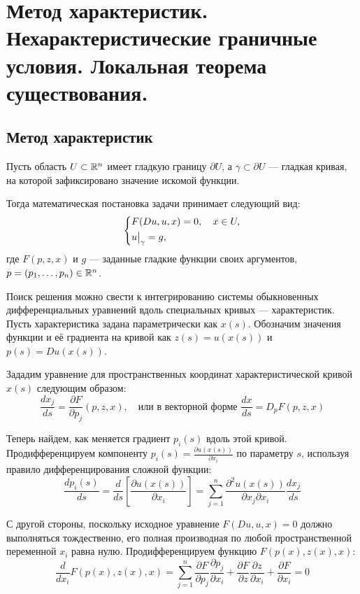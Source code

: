 \section{Метод характеристик. Нехарактеристические граничные условия. Локальная теорема существования.}
\subsection{Метод характеристик}
Пусть область $U \subset \mathbb{R}^n$ имеет гладкую границу $\partial U$, 
а $\gamma \subset \partial U$ — гладкая кривая, на которой зафиксировано 
значение искомой функции. 

Тогда математическая постановка задачи принимает следующий вид:
\begin{equation} \label{eq::1}
\left\{\begin{aligned}
    &F(Du, u, x) = 0, \quad x \in U, \\
    &u\big|_{\gamma} = g,
\end{aligned}\right.
\end{equation}
где $F(p, z, x)$ и $g$ — заданные гладкие функции своих аргументов, 
$p = (p_1, \dots, p_n) \in \mathbb{R}^n$.

Поиск решения можно свести к интегрированию системы обыкновенных дифференциальных 
уравнений вдоль специальных кривых --- характеристик. 
Пусть характеристика задана параметрически как $x(s)$. Обозначим значения 
функции и её градиента на кривой как $z(s) = u(x(s))$ и $p(s) = Du(x(s))$.
    
Зададим уравнение для пространственных координат характеристической кривой $x(s)$ следующим образом:
\begin{equation}
\frac{dx_j}{ds} = \frac{\partial F}{\partial p_j}(p, z, x),
\quad \text{или в векторной форме } \frac{dx}{ds} = D_p F(p, z, x)
\end{equation}

Теперь найдем, как меняется градиент $p_i(s)$ вдоль этой кривой. 
Продифференцируем компоненту $p_i(s) = \frac{\partial u(x(s))}{\partial x_i}$
по параметру $s$, используя правило дифференцирования сложной функции:
\begin{equation} \label{eq::dp_ds_chain}
\frac{dp_i(s)}{ds} = \frac{d}{ds} \left[ \frac{\partial u(x(s))}{\partial x_i} \right] = \sum_{j=1}^n \frac{\partial^2 u(x(s))}{\partial x_j \partial x_i} \frac{dx_j}{ds}
\end{equation}

С другой стороны, поскольку исходное уравнение $F(Du, u, x) = 0$ должно
выполняться тождественно, его полная производная по любой пространственной
переменной $x_i$ равна нулю. Продифференцируем функцию $F(p(x), z(x), x)$:
\begin{equation}
\frac{d}{dx_i} F(p(x), z(x), x) = \sum_{j=1}^n \frac{\partial F}{\partial p_j} \frac{\partial p_j}{\partial x_i} + \frac{\partial F}{\partial z} \frac{\partial z}{\partial x_i} + \frac{\partial F}{\partial x_i} = 0
\end{equation}

